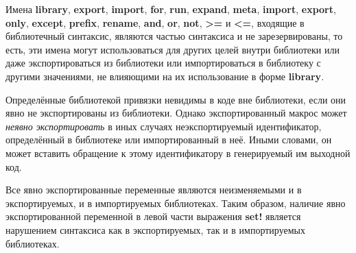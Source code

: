 \begin{note}
Имена {\cf\bfseries library}, {\cf\bfseries export}, {\cf\bfseries import}, {\cf\bfseries for},
{\cf\bfseries run}, {\cf\bfseries expand}, {\cf\bfseries meta}, {\cf\bfseries import},
{\cf\bfseries export}, {\cf\bfseries only}, {\cf\bfseries except}, {\cf\bfseries prefix},
{\cf\bfseries rename}, {\cf\bfseries and}, {\cf\bfseries or}, {\cf\bfseries not}, {\cf\bfseries
  >=} и {\cf\bfseries <=}, входящие в библиотечный синтаксис, являются частью синтаксиса и не
зарезервированы, то есть, эти имена могут использоваться для других целей внутри
библиотеки или даже экспортироваться из библиотеки или импортироваться в библиотеку с другими
значениями, не влияющими на их использование в форме {\cf\bfseries library}.
\end{note}

Определённые библиотекой привязки невидимы в коде вне библиотеки, если они явно не
экспортированы из библиотеки. Однако экспортированный макрос может \emph{неявно экспортировать}
в иных случаях неэкспортируемый идентификатор, определённый в библиотеке или
импортированный в неё. Иными словами, он может вставить обращение к этому идентификатору
в генерируемый им выходной код.\vspace{-1.2mm}

\label{importsareimmutablesection}
Все явно экспортированные переменные являются неизменяемыми и в экспортируемых, и в импортируемых
библиотеках. Таким образом, наличие явно экспортированной переменной в левой части выражения
{\cf\bfseries set!} является нарушением синтаксиса как в экспортируемых, так и в импортируемых
библиотеках.\vspace{-1.2mm}

